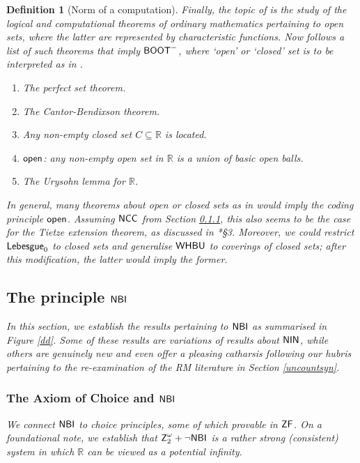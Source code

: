\documentclass[reqno]{amsart}
\newtheorem{defi}[thm]{Definition}
\def\Z{\textup{\textsf{Z}}}
\def\ZF{\textup{\textsf{ZF}}}
\def\R{{\mathbb  R}}
\def\LEB{\textup{\textsf{Lebesgue}}}
\def\NCC{\textup{\textsf{NCC}}}
\def\NBIJ{\textup{\textsf{NBI}}}
\def\NBI{\textup{\textsf{NBI}}}
\def\NIN{\textup{\textsf{NIN}}}
\def\BOOT{\textup{\textsf{BOOT}}}
\def\open{\textup{\textsf{open}}}
\def\WHBU{\textup{\textsf{WHBU}}}
\numberwithin{equation}{section}
\numberwithin{thm}{section}
\begin{document}
\begin{defi}[Norm of a computation]
Finally, the topic of \cite{dagsamVII} is the study of the logical and computational theorems of ordinary mathematics \emph{pertaining to open sets}, where the latter are represented 
by characteristic functions.  %
Now follows a list of such theorems that imply $\BOOT^{-}$, where `open' or `closed' set is to be interpreted as in \cite{dagsamVII}.  %
\begin{enumerate}
\renewcommand{\theenumi}{\alph{enumi}}
\item The perfect set theorem.
\item The Cantor-Bendixson theorem.
\item Any non-empty closed set $C\subseteq \R$ is located. 
\item $\open$: any non-empty open set in $\R$ is a union of basic open balls. 
\item The Urysohn lemma for $\R$.
\end{enumerate} 
In general, many theorems about open or closed sets as in \cite{dagsamVII} would imply the coding principle $\open$.  
Assuming $\NCC$ from Section \ref{uncountsyn2}, this also seems to be the case for the Tietze extension theorem, as discussed in \cite{dagsamIX}*{\S3}.
Moreover, we could restrict $\LEB_{0}$ to \emph{closed} sets and generalise $\WHBU$ to coverings of \emph{closed} sets; after this modification, the latter would imply the former. 
\subsection{The principle $\NBIJ$}\label{bereft}
In this section, we establish the results pertaining to $\NBI$ as summarised in Figure \ref{dd}.
Some of these results are variations of results about $\NIN$, while others are genuinely new and even offer a pleasing \emph{catharsis} following our hubris pertaining to the re-examination of the RM literature in Section \ref{uncountsyn}.  

\subsubsection{The Axiom of Choice and $\NBI$}\label{uncountsyn2}
We connect $\NBI$ to choice principles, some of which provable in $\ZF$.
On a foundational note, we establish that $\Z_{2}^{\omega}+\neg\NBI$ is a rather strong (consistent) system in which $\R$ can be viewed as a potential infinity. 

\smallskip


\end{defi}
\end{document}
